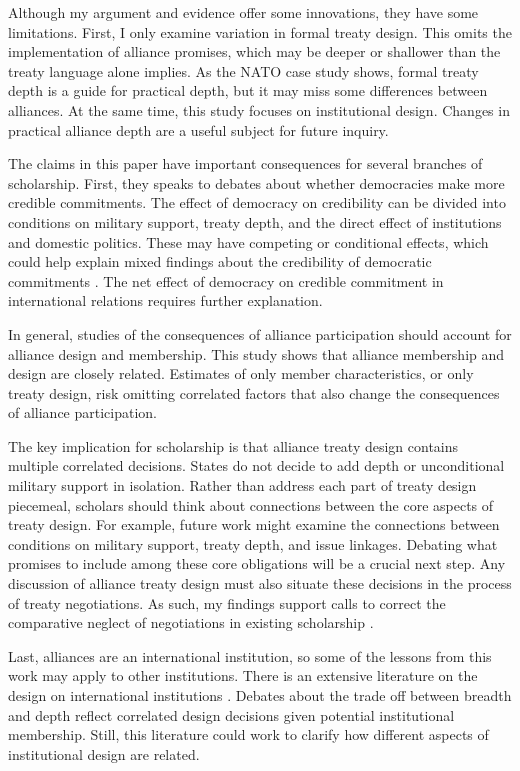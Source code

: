 \documentclass[12pt]{article}
\begin{document}
Although my argument and evidence offer some innovations, they have some limitations. 
First, I only examine variation in formal treaty design. 
This omits the implementation of alliance promises, which may be deeper or shallower than the treaty language alone implies. 
As the NATO case study shows, formal treaty depth is a guide for practical depth, but it may miss some differences between alliances. 
At the same time, this study focuses on institutional design. 
Changes in practical alliance depth are a useful subject for future inquiry. 


The claims in this paper have important consequences for several branches of scholarship. 
First, they speaks to debates about whether democracies make more credible commitments. 
The effect of democracy on credibility can be divided into conditions on military support, treaty depth, and the direct effect of institutions and domestic politics. 
These may have competing or conditional effects, which could help explain mixed findings about the credibility of democratic commitments \citep{Schultz1999, Leeds1999, Thyne2012, DownesSechser2012}.
The net effect of democracy on credible commitment in international relations requires further explanation. 


In general, studies of the consequences of alliance participation should account for alliance design and membership. 
This study shows that alliance membership and design are closely related. 
Estimates of only member characteristics, or only treaty design, risk omitting correlated factors that also change the consequences of alliance participation. 


The key implication for scholarship is that alliance treaty design contains multiple correlated decisions. 
States do not decide to add depth or unconditional military support in isolation. 
Rather than address each part of treaty design piecemeal, scholars should think about connections between the core aspects of treaty design. 
For example, future work might examine the connections between conditions on military support, treaty depth, and issue linkages.  
Debating what promises to include among these core obligations will be a crucial next step. 
Any discussion of alliance treaty design must also situate these decisions in the process of treaty negotiations.
As such, my findings support calls to correct the comparative neglect of negotiations in existing scholarship \citep{Poast2019a}. 


Last, alliances are an international institution, so some of the lessons from this work may apply to other institutions. 
There is an extensive literature on the design on international institutions \citep{DownesRocke1995, MartinSimmons1998, Koremenosetal2001, Koremenos2005, Thompson2010}.
Debates about the trade off between breadth and depth \citep{Downsetal1998, Gilligan2004} reflect correlated design decisions given potential institutional membership. 
Still, this literature could work to clarify how different aspects of institutional design are related. 
\end{document}
